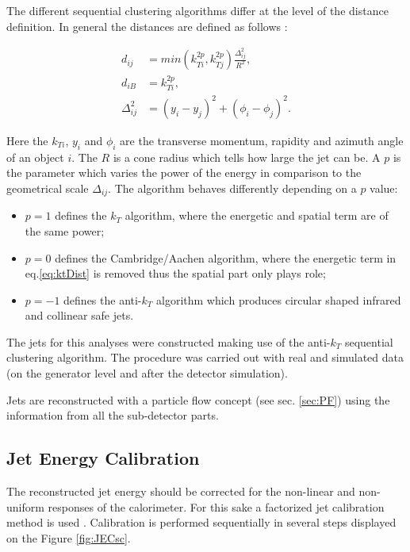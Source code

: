 The different sequential clustering algorithms differ at the level of the distance definition. In general the distances are defined as follows \cite{Cacciari:2008gp}:

\begin{align}
 d_{ij} & = min(k_{Ti}^{2p}, k_{Tj}^{2p}) \frac{\Delta_{ij}^{2}}{R^{2}},\label{eq:ktDist} \\
 d_{iB} & = k_{Ti}^{2p}, \\
 \Delta_{ij}^{2} & = (y_{i} - y_{j})^{2} + (\phi_{i} - \phi_{j})^{2}.
\end{align}

Here the $k_{Ti}$, $y_{i}$ and $\phi_i$ are the transverse momentum, rapidity and azimuth angle of an object $i$. The $R$ is a cone radius which tells 
how large the jet can be. A $p$ is the parameter which varies the power of the energy in comparison to the geometrical scale $\Delta_{ij}$.
The algorithm behaves differently depending on a $p$ value:

\begin{itemize}
 \item $p = 1$ defines the $k_{T}$ algorithm, where the energetic and spatial term are of the same power;
 \item $p = 0$ defines the Cambridge/Aachen algorithm, where the energetic term in eq.\ref{eq:ktDist} is removed thus the spatial part only plays role;
 \item $p = -1$ defines the anti-$k_{T}$ algorithm which produces circular shaped infrared and collinear safe jets.
\end{itemize}

The jets for this analyses were constructed making use of the anti-$k_{T}$ sequential clustering algorithm. The procedure was carried out with real and
simulated data (on the generator level and after the detector simulation).

Jets are reconstructed with a particle flow concept (see sec. \ref{sec:PF}) using the information from all the sub-detector parts.

\subsection{Jet Energy Calibration}\label{ssec:JCal}

The reconstructed jet energy should be corrected for the non-linear and non-uniform responses of the calorimeter. For this sake a factorized jet calibration
method is used \cite{2011JInst...611002C}. Calibration is performed sequentially in several steps displayed on the Figure \ref{fig:JECsc}.

